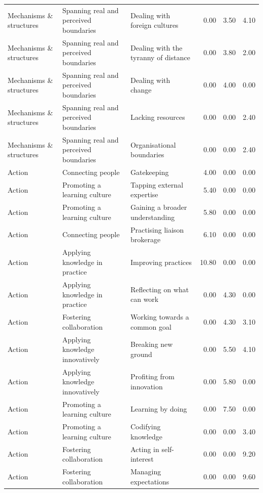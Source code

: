 \begin{table}[htbp]
{\begin{tabular}{lllrrr}
Mechanisms \& structures & Spanning real and perceived boundaries & Dealing with foreign cultures & 0.00 & 3.50 & 4.10 \\ 
Mechanisms \& structures & Spanning real and perceived boundaries & Dealing with the tyranny of distance & 0.00 & 3.80 & 2.00 \\ 
Mechanisms \& structures & Spanning real and perceived boundaries & Dealing with change & 0.00 & 4.00 & 0.00 \\ 
Mechanisms \& structures & Spanning real and perceived boundaries & Lacking resources & 0.00 & 0.00 & 2.40 \\ 
Mechanisms \& structures & Spanning real and perceived boundaries & Organisational boundaries & 0.00 & 0.00 & 2.40 \\ 
Action & Connecting people & Gatekeeping & 4.00 & 0.00 & 0.00 \\ 
Action & Promoting a learning culture & Tapping external expertise & 5.40 & 0.00 & 0.00 \\ 
Action & Promoting a learning culture & Gaining a broader understanding & 5.80 & 0.00 & 0.00 \\ 
Action & Connecting people & Practising liaison brokerage & 6.10 & 0.00 & 0.00 \\ 
Action & Applying knowledge in practice & Improving practices & 10.80 & 0.00 & 0.00 \\ 
Action & Applying knowledge in practice & Reflecting on what can work & 0.00 & 4.30 & 0.00 \\ 
Action & Fostering collaboration & Working towards a common goal & 0.00 & 4.30 & 3.10 \\ 
Action & Applying knowledge innovatively & Breaking new ground & 0.00 & 5.50 & 4.10 \\ 
Action & Applying knowledge innovatively & Profiting from innovation & 0.00 & 5.80 & 0.00 \\ 
Action & Promoting a learning culture & Learning by doing & 0.00 & 7.50 & 0.00 \\ 
Action & Promoting a learning culture & Codifying knowledge & 0.00 & 0.00 & 3.40 \\ 
Action & Fostering collaboration & Acting in self-interest & 0.00 & 0.00 & 9.20 \\ 
Action & Fostering collaboration & Managing expectations & 0.00 & 0.00 & 9.60 \\ 
\bottomrule
\end{tabular}
}
\end{table}


